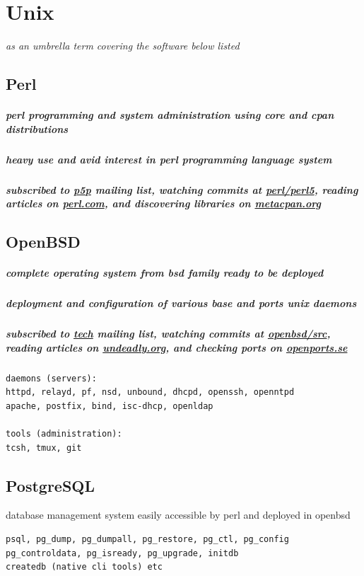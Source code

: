 \documentclass {article}
\begin{document}
  \section{Unix} %
    \textit{as an umbrella term covering the software below listed}
    \subsection{Perl}
      \subparagraph{perl programming and system administration using core and cpan distributions}
      \subparagraph{heavy use and avid interest in perl programming language system}
      \subparagraph{subscribed to \href{https://lists.perl.org/list/perl5-porters.html}{p5p} mailing list, watching commits at \href{https://github.com/Perl/perl5}{perl/perl5}, reading articles on \href{https://perl.com/}{perl.com}, and discovering libraries on \href{https://metacpan.org/}{metacpan.org}}
    \subsection{OpenBSD}
      \subparagraph{complete operating system from bsd family ready to be deployed}
      \subparagraph{deployment and configuration of various base and ports unix daemons}
      \subparagraph{subscribed to \href{https://www.openbsd.org/mail.html}{tech} mailing list, watching commits at \href{https://github.com/openbsd/src}{openbsd/src}, reading articles on \href{https://undeadly.org//}{undeadly.org}, and checking ports on \href{https://openports.se/}{openports.se}}
      \begin{verbatim}
daemons (servers):
httpd, relayd, pf, nsd, unbound, dhcpd, openssh, openntpd
apache, postfix, bind, isc-dhcp, openldap

tools (administration):
tcsh, tmux, git
   \end{verbatim}

    \subsection{PostgreSQL}
      database management system easily accessible by perl and deployed in openbsd
      \begin{verbatim}
psql, pg_dump, pg_dumpall, pg_restore, pg_ctl, pg_config
pg_controldata, pg_isready, pg_upgrade, initdb
createdb (native cli tools) etc
  \end{verbatim}
\end{document}
